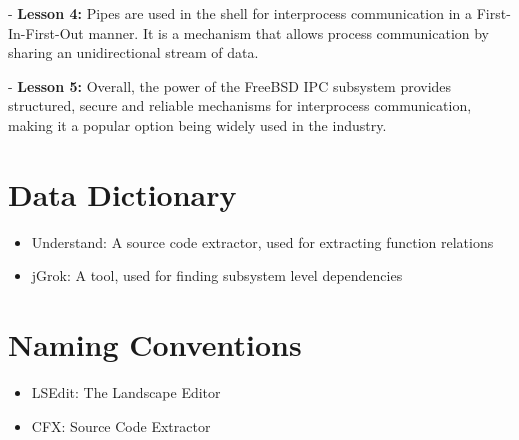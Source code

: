\documentclass[12pt, dvipsnames, a4paper]{article}
\begin{document}
- \textbf{Lesson 4:} Pipes are used in the shell for interprocess communication in a First-In-First-Out manner. It is a mechanism that allows process communication by sharing an unidirectional stream of data.

- \textbf{Lesson 5:} Overall, the power of the FreeBSD IPC subsystem provides structured, secure and reliable mechanisms for interprocess communication, making it a popular option being widely used in the industry.
\clearpage

\section{Data Dictionary}
\begin{itemize}
	\item{Understand: A source code extractor, used for extracting function relations}
	\item {jGrok: A tool, used for finding subsystem level dependencies}
\end{itemize}

\section{Naming Conventions}
\begin{itemize}
	\item{LSEdit: The Landscape Editor}
	\item {CFX: Source Code Extractor}
\end{itemize}
\end{document}
